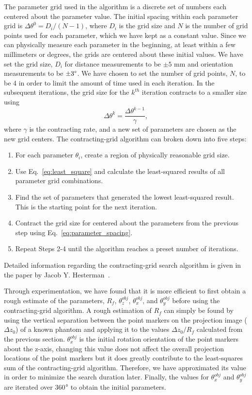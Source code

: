 The parameter grid used in the algorithm is a discrete set of numbers each centered about the parameter value.  The initial spacing within each parameter grid is $\Delta \theta^0 = D_i/(N-1)$, where $D_i$ is the grid size and $N$ is the number of grid points used for each parameter, which we have kept as a constant value.  Since we can physically measure each parameter in the beginning, at least within a few millimeters or degrees, the grids are centered about these initial values.  We have set the grid size, $D_i$ for distance measurements to be $\pm 5$ mm and orientation measurements to be $\pm 3 \degree$.  We have chosen to set the number of grid points, $N$, to be 4 in order to limit the amount of time used in each iteration.  In the subsequent iterations, the grid size for the $k^{th}$ iteration contracts to a smaller size using
%
\begin{equation}
\label{eq:parameter_spacing}
\Delta \theta^k = \frac{\Delta \theta^{k-1}}{\gamma},
\end{equation}
%
where $\gamma$ is the contracting rate, and a new set of parameters are chosen as the new grid centers.  The contracting-grid algorithm can broken down into five steps:
%
\begin{enumerate}
\item For each parameter $\theta_i$, create a region of physically reasonable grid size.
\item Use Eq.~\ref{eq:least_square} and calculate the least-squared results of all parameter grid combinations.
\item Find the set of parameters that generated the lowest least-squared result.  This is the starting point for the next iteration.
\item Contract the grid size for centered about the parameters from the previous step using Eq.~\ref{eq:parameter_spacing}.
\item Repeat Steps 2-4 until the algorithm reaches a preset number of iterations.
\end{enumerate}
Detailed information regarding the contracting-grid search algorithm is given in the paper by Jacob Y. Hesterman~\citep{Hesterman2010}.  

Through experimentation, we have found that it is more efficient to first obtain a rough estimate of the parameters, $R_f$, $\theta^{obj}_z$, $\theta^{obj}_x$, and $\theta^{obj}_y$ before using the contracting-grid algorithm.  A rough estimation of $R_f$ can simply be found by using the vertical separation between the point markers on the projection image ($\Delta z_0$) of a known phantom and applying it to the values $\Delta z_0/R_f$ calculated from the previous section.  $\theta^{obj}_x$ is the initial rotation orientation of the point markers about the z-axis, changing this value does not affect the overall projection locations of the point markers but it does greatly contribute to the least-squares sum of the contracting-grid algorithm.  Therefore, we have approximated its value in order to minimize the search duration later.  Finally, the values for $\theta_x^{obj}$ and $\theta_y^{obj}$ are iterated over 360$\degree$ to obtain the initial parameters.


